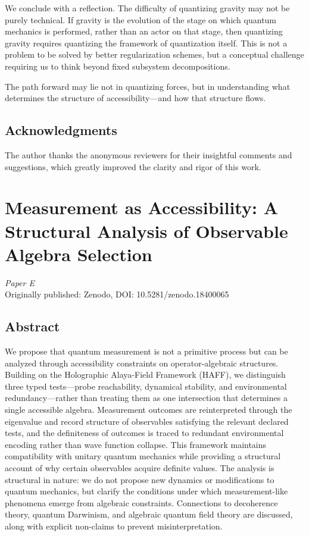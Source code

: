 \documentclass[12pt,a4paper,openany]{book}
\begin{document}
We conclude with a reflection. The difficulty of quantizing gravity may not be purely technical. If gravity is the evolution of the stage on which quantum mechanics is performed, rather than an actor on that stage, then quantizing gravity requires quantizing the framework of quantization itself. This is not a problem to be solved by better regularization schemes, but a conceptual challenge requiring us to think beyond fixed subsystem decompositions.

The path forward may lie not in quantizing forces, but in understanding what determines the structure of accessibility—and how that structure flows.

\section*{Acknowledgments}

The author thanks the anonymous reviewers for their insightful comments and suggestions, which greatly improved the clarity and rigor of this work.

\chapter{Measurement as Accessibility: A Structural Analysis of Observable Algebra Selection}
\label{chap:paperE}

\begin{center}
\textit{Paper E}\\[0.5em]
Originally published: Zenodo, DOI: 10.5281/zenodo.18400065
\end{center}

\bigskip

\section*{Abstract}
We propose that quantum measurement is not a primitive process but can be analyzed through accessibility constraints on operator-algebraic structures. Building on the Holographic Alaya-Field Framework (HAFF), we distinguish three typed tests---probe reachability, dynamical stability, and environmental redundancy---rather than treating them as one intersection that determines a single accessible algebra. Measurement outcomes are reinterpreted through the eigenvalue and record structure of observables satisfying the relevant declared tests, and the definiteness of outcomes is traced to redundant environmental encoding rather than wave function collapse. This framework maintains compatibility with unitary quantum mechanics while providing a structural account of why certain observables acquire definite values. The analysis is structural in nature: we do not propose new dynamics or modifications to quantum mechanics, but clarify the conditions under which measurement-like phenomena emerge from algebraic constraints. Connections to decoherence theory, quantum Darwinism, and algebraic quantum field theory are discussed, along with explicit non-claims to prevent misinterpretation.
\end{document}
